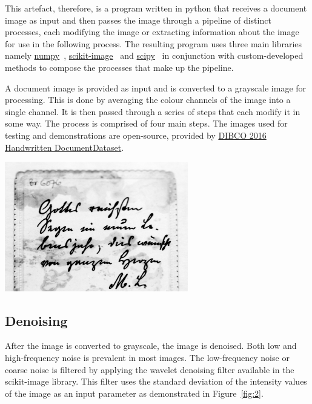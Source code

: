 \documentclass[a4paper, 12pt]{report}
\begin{document}
This artefact, therefore, is a program written in python that receives a document image as input and then passes the image through a pipeline of distinct processes, each modifying the image or extracting information about the image for use in the following process. The resulting program uses three main libraries namely \href{https://numpy.org/}{numpy}~\cite{numpy}, \href{https://scikit-image.org/}{scikit-image}~\cite{scikit-image} and \href{https://scikit-image.org/}{scipy}~\cite{2020SciPy-NMeth} in conjunction with custom-developed methods to compose the processes that make up the pipeline. \par

A document image is provided as input and is converted to a grayscale image for processing. This is done by averaging the colour channels of the image into a single channel. It is then passed through a series of steps that each modify it in some way. The process is comprised of four main steps. The images used for testing and
demonstrations are open-source, provided by \href{https://vc.ee.duth.gr/h-dibco2016/}{DIBCO 2016 Handwritten DocumentDataset}.

\noindent
\begin{minipage}{\linewidth}
    \centering
    \includegraphics[width=8cm]{original.png}
    \label{fig:1}
\end{minipage}

\subsection{Denoising}
After the image is converted to grayscale, the image is denoised. Both low and high-frequency noise is prevalent in most images. The low-frequency noise or coarse noise is filtered by applying the wavelet denoising filter available in the scikit-image library. This filter uses the standard deviation of the intensity values of the image as an input parameter as demonstrated in Figure~\ref{fig:2}.
\end{document}
